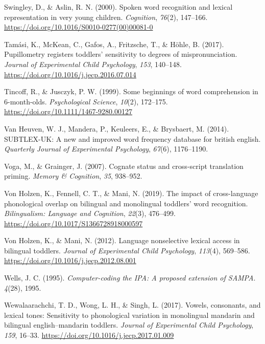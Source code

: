 \documentclass[
]{article}
\newlength{\cslhangindent}
\newlength{\cslentryspacingunit} %
\newenvironment{CSLReferences}[2] %
 {%
  \setlength{\parindent}{0pt}
  \ifodd #1
  \let\oldpar\par
  \def\par{\hangindent=\cslhangindent\oldpar}
  \fi
  \setlength{\parskip}{#2\cslentryspacingunit}
 }%
 {}
\begin{document}
\begin{CSLReferences}{1}{0}
\leavevmode{}%
Swingley, D., \& Aslin, R. N. (2000). Spoken word recognition and
lexical representation in very young children. \emph{Cognition},
\emph{76}(2), 147--166.
\url{https://doi.org/10.1016/S0010-0277(00)00081-0}

\leavevmode{}%
Tamási, K., McKean, C., Gafos, A., Fritzsche, T., \& Höhle, B. (2017).
Pupillometry registers toddlers' sensitivity to degrees of
mispronunciation. \emph{Journal of Experimental Child Psychology},
\emph{153}, 140--148. \url{https://doi.org/10.1016/j.jecp.2016.07.014}

\leavevmode{}%
Tincoff, R., \& Jusczyk, P. W. (1999). Some beginnings of word
comprehension in 6-month-olds. \emph{Psychological Science},
\emph{10}(2), 172--175. \url{https://doi.org/10.1111/1467-9280.00127}

\leavevmode{}%
Van Heuven, W. J., Mandera, P., Keuleers, E., \& Brysbaert, M. (2014).
{SUBTLEX}-{UK}: A new and improved word frequency database for british
english. \emph{Quarterly Journal of Experimental Psychology},
\emph{67}(6), 1176--1190.

\leavevmode{}%
Voga, M., \& Grainger, J. (2007). Cognate status and cross-script
translation priming. \emph{Memory \& Cognition}, \emph{35}, 938--952.

\leavevmode{}%
Von Holzen, K., Fennell, C. T., \& Mani, N. (2019). The impact of
cross-language phonological overlap on bilingual and monolingual
toddlers' word recognition. \emph{Bilingualism: Language and Cognition},
\emph{22}(3), 476--499. \url{https://doi.org/10.1017/S1366728918000597}

\leavevmode{}%
Von Holzen, K., \& Mani, N. (2012). Language nonselective lexical access
in bilingual toddlers. \emph{Journal of Experimental Child Psychology},
\emph{113}(4), 569--586.
\url{https://doi.org/10.1016/j.jecp.2012.08.001}

\leavevmode{}%
Wells, J. C. (1995). \emph{Computer-coding the {IPA}: A proposed
extension of {SAMPA}}. \emph{4}(28), 1995.

\leavevmode{}%
Wewalaarachchi, T. D., Wong, L. H., \& Singh, L. (2017). Vowels,
consonants, and lexical tones: Sensitivity to phonological variation in
monolingual mandarin and bilingual english--mandarin toddlers.
\emph{Journal of Experimental Child Psychology}, \emph{159}, 16--33.
\url{https://doi.org/10.1016/j.jecp.2017.01.009}


\end{CSLReferences}
\end{document}
